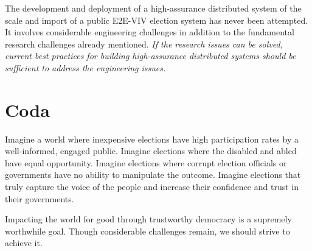 
The development and deployment of a high-assurance distributed system
of the scale and import of a public E2E-VIV election system has never
been attempted. It involves considerable engineering challenges in
addition to the fundamental research challenges already
mentioned. \emph{If the research issues can be solved, current best
practices for building high-assurance distributed systems should be
sufficient to address the engineering issues.}

\section*{Coda}


Imagine a world where inexpensive elections have high participation
rates by a well-informed, engaged public. Imagine elections where the
disabled and abled have equal opportunity. Imagine elections where
corrupt election officials or governments have no ability to
manipulate the outcome. Imagine elections that truly capture the voice
of the people and increase their confidence and trust in their
governments.

Impacting the world for good through trustworthy democracy is a
supremely worthwhile goal. Though considerable challenges remain, we
should strive to achieve it.
